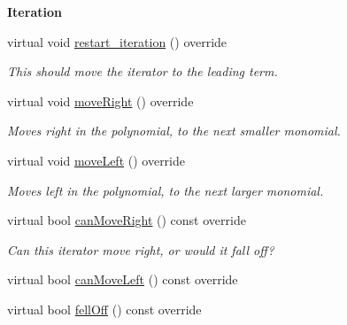 \begin{Indent}\textbf{ Iteration}\par
\begin{DoxyCompactItemize}
\item 
\mbox{\label{group___iterator_group_a897042008adc0e4db52f27616fe30115}} 
virtual void \hyperlink{group___iterator_group_a897042008adc0e4db52f27616fe30115}{restart\+\_\+iteration} () override
\begin{DoxyCompactList}\small\item\em This should move the iterator to the leading term. \end{DoxyCompactList}\item 
\mbox{\label{group___iterator_group_a2a9dfd3f6a8520fd3b045f32b12f7ac9}} 
virtual void \hyperlink{group___iterator_group_a2a9dfd3f6a8520fd3b045f32b12f7ac9}{move\+Right} () override
\begin{DoxyCompactList}\small\item\em Moves right in the polynomial, to the next smaller monomial. \end{DoxyCompactList}\item 
\mbox{\label{group___iterator_group_ad7ff9576d9d9576acb2776ce42a5dde3}} 
virtual void \hyperlink{group___iterator_group_ad7ff9576d9d9576acb2776ce42a5dde3}{move\+Left} () override
\begin{DoxyCompactList}\small\item\em Moves left in the polynomial, to the next larger monomial. \end{DoxyCompactList}\item 
\mbox{\label{group___iterator_group_ad0518860ffbda4026f68495abbaeeba9}} 
virtual bool \hyperlink{group___iterator_group_ad0518860ffbda4026f68495abbaeeba9}{can\+Move\+Right} () const override
\begin{DoxyCompactList}\small\item\em Can this iterator move right, or would it fall off? \end{DoxyCompactList}\item 
virtual bool \hyperlink{group___iterator_group_ade22e36aead8eca568dbd99c6ab73cc2}{can\+Move\+Left} () const override
\item 
virtual bool \hyperlink{group___iterator_group_a1b87a857220a97fe403c5164a51f86eb}{fell\+Off} () const override
\end{DoxyCompactItemize}
\end{Indent}
